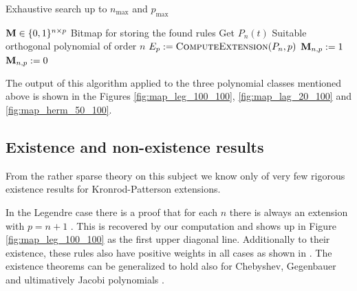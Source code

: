 \documentclass[a4paper,10pt]{article}
\begin{document}
\begin{algorithm}
  \caption{Exhaustive search up to $n_{\textrm{max}}$ and $p_{\textrm{max}}$}
  \label{alg:exhaustive_search}
  \begin{algorithmic}
      \State $\mathbf{M} \in \{0,1\}^{n \times p}$
      \Comment Bitmap for storing the found rules
        \State Get $P_n(t)$
        \Comment Suitable orthogonal polynomial of order $n$
          \State $E_p := \textsc{ComputeExtension}(P_n, p)$
            \State $\mathbf{M}_{n,p} := 1$
          \Else
            \State $\mathbf{M}_{n,p} := 0$
          \EndIf
        \EndFor
      \EndFor
    \EndProcedure
  \end{algorithmic}
\end{algorithm}

The output of this algorithm applied to the three polynomial classes mentioned
above is shown in the Figures \ref{fig:map_leg_100_100}, \ref{fig:map_lag_20_100}
and \ref{fig:map_herm_50_100}.


\subsection{Existence and non-existence results}

From the rather sparse theory on this subject we know only of very few rigorous
existence results for Kronrod-Patterson extensions.

In the Legendre case there is a proof that for each $n$ there is
always an extension with $p = n + 1$ \cite{szegoe}. This is recovered by our
computation and shows up in Figure \ref{fig:map_leg_100_100} as the first upper
diagonal line. Additionally to their existence, these rules also have positive
weights in all cases as shown in \cite{monegato1978}. The existence theorems can
be generalized to hold also for Chebyshev, Gegenbauer and ultimatively Jacobi
polynomials \cite{gautschi-notaris, gautschi, notaris1990, monegato1978_2}.
\end{document}
